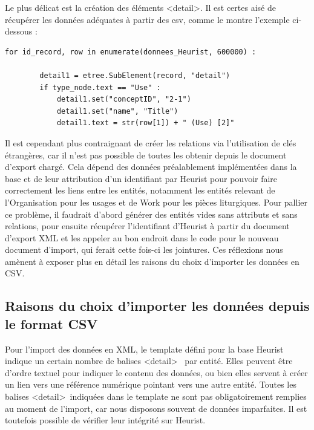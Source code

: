 \documentclass[a4paper,12pt,twoside]{book}
\begin{document}
Le plus délicat est la création des éléments \textless detail\textgreater . Il est certes aisé de récupérer les données adéquates à partir des csv, comme le montre l'exemple ci-dessous : 
\begin{verbatim}
for id_record, row in enumerate(donnees_Heurist, 600000) :

        detail1 = etree.SubElement(record, "detail")
        if type_node.text == "Use" :
            detail1.set("conceptID", "2-1")
            detail1.set("name", "Title")
            detail1.text = str(row[1]) + " (Use) [2]"

\end{verbatim}
Il est cependant plus contraignant de créer les relations via l'utilisation de clés étrangères, car il n'est pas possible de toutes les obtenir depuis le document d'export chargé. Cela dépend des données préalablement implémentées dans la base et de leur attribution d'un identifiant par Heurist pour pouvoir faire correctement les liens entre les entités, notamment les entités relevant de l'\og Organisation\fg{} pour les usages et de \og Work\fg{} pour les pièces liturgiques. Pour pallier ce problème, il faudrait d'abord générer des entités vides sans attributs et sans relations, pour ensuite récupérer l'identifiant d'Heurist à partir du document d'export XML et les appeler au bon endroit dans le code pour le nouveau document d'import, qui ferait cette fois-ci les jointures. Ces réflexions nous amènent à exposer plus en détail les raisons du choix d'importer les données en CSV. 

	
	\subsection{Raisons du choix d’importer les données depuis le format CSV}
	
Pour l'import des données en XML, le template défini pour la base Heurist indique un certain nombre de balises \textless detail\textgreater~ par entité. Elles peuvent être d'ordre textuel pour indiquer le contenu des données, ou bien elles servent à créer un lien vers une référence numérique pointant vers une autre entité. Toutes les balises \textless detail\textgreater~indiquées dans le template ne sont pas obligatoirement remplies au moment de l'import, car nous disposons souvent de données imparfaites. Il est toutefois possible de vérifier leur intégrité sur Heurist.
	
\end{document}
